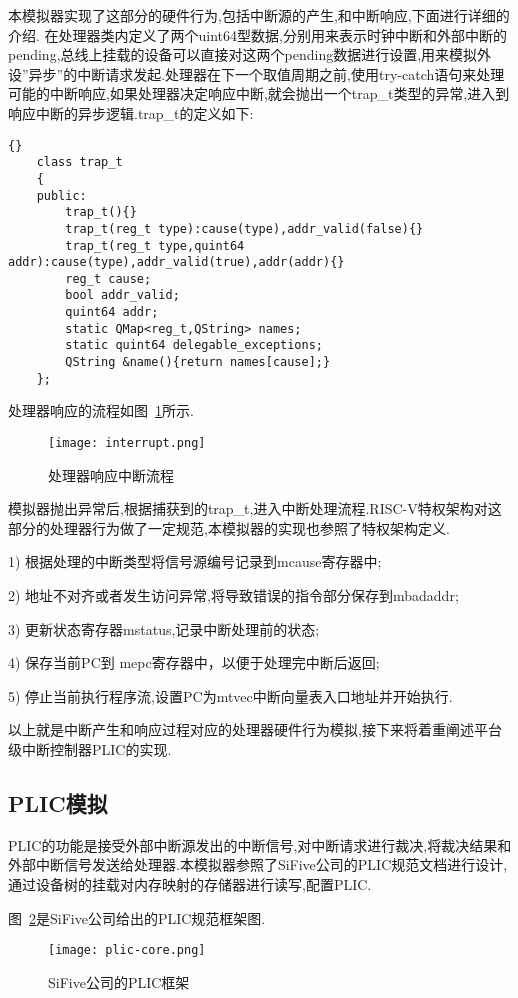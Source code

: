 本模拟器实现了这部分的硬件行为,包括中断源的产生,和中断响应,下面进行详细的介绍.
在处理器类内定义了两个uint64型数据,分别用来表示时钟中断和外部中断的pending,总线上挂载的设备可以直接对这两个pending数据进行设置,用来模拟外设”异步”的中断请求发起.处理器在下一个取值周期之前,使用try-catch语句来处理可能的中断响应,如果处理器决定响应中断,就会抛出一个trap\_t类型的异常,进入到响应中断的异步逻辑.trap\_t的定义如下:
\begin{lstlisting}{}
    class trap_t
    {
    public:
        trap_t(){}
        trap_t(reg_t type):cause(type),addr_valid(false){}
        trap_t(reg_t type,quint64 addr):cause(type),addr_valid(true),addr(addr){}
        reg_t cause;
        bool addr_valid;
        quint64 addr;
        static QMap<reg_t,QString> names;
        static quint64 delegable_exceptions;
        QString &name(){return names[cause];}
    };        
\end{lstlisting}

处理器响应的流程如图~\ref{fig:interrupt}所示.
\begin{figure}[h]
    \centering
    \texttt{[image: interrupt.png]}
    \caption{处理器响应中断流程}
    \label{fig:interrupt}
\end{figure}

模拟器抛出异常后,根据捕获到的trap\_t,进入中断处理流程.RISC-V特权架构对这部分的处理器行为做了一定规范,本模拟器的实现也参照了特权架构定义.


1) 根据处理的中断类型将信号源编号记录到mcause寄存器中;


2) 地址不对齐或者发生访问异常,将导致错误的指令部分保存到mbadaddr;


3) 更新状态寄存器mstatus,记录中断处理前的状态;


4) 保存当前PC到 mepc寄存器中，以便于处理完中断后返回;


5) 停止当前执行程序流,设置PC为mtvec中断向量表入口地址并开始执行.


以上就是中断产生和响应过程对应的处理器硬件行为模拟,接下来将着重阐述平台级中断控制器PLIC的实现.


\subsection{PLIC模拟}

PLIC的功能是接受外部中断源发出的中断信号,对中断请求进行裁决,将裁决结果和外部中断信号发送给处理器.本模拟器参照了SiFive公司的PLIC规范文档进行设计,通过设备树的挂载对内存映射的存储器进行读写,配置PLIC.


图~\ref{fig:plic-core}是SiFive公司给出的PLIC规范框架图.
\begin{figure}[h]
    \centering
    \texttt{[image: plic-core.png]}
    \caption{SiFive公司的PLIC框架}
    \label{fig:plic-core}
\end{figure}


